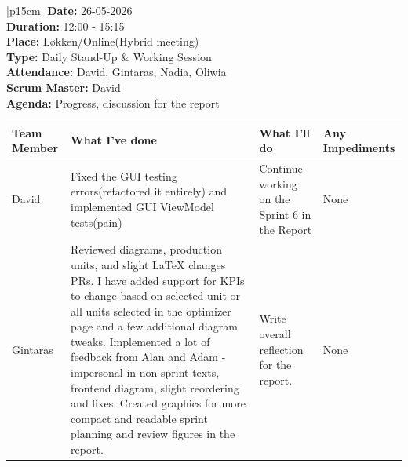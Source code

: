 \begin{table}[H]
    \centering
    \begin{tabular}{|p{15cm}|}   
        \hline
        \textbf{Date:}  26-05-2026 \\
        \textbf{Duration:}  12:00 - 15:15 \\
        \textbf{Place:}  Løkken/Online(Hybrid meeting) \\
        \textbf{Type:} Daily Stand-Up \& Working Session \\
        \textbf{Attendance:}  David, Gintaras, Nadia, Oliwia\\
        \textbf{Scrum Master:}  David \\
        \textbf{Agenda:} Progress, discussion for the report
        \begin{table}[H]
            \begin{tabular}{|p{1.75cm}|p{4cm}|p{4cm}|p{4cm}|}
                \hline
                \cellcolor[HTML]{BFBFBF}  \textbf{Team Member} & \cellcolor[HTML]{BFBFBF}  \textbf{What I've done} & \cellcolor[HTML]{BFBFBF}  \textbf{What I'll do} & \cellcolor[HTML]{BFBFBF}  \textbf{Any Impediments}\\
                \hline
                \cellcolor[HTML]{d4d4d4} David & Fixed the GUI testing errors(refactored it entirely) and implemented GUI ViewModel tests(pain) & Continue working on the Sprint 6 in the Report & None \\
                \hline
                \cellcolor[HTML]{d4d4d4} Gintaras & Reviewed diagrams, production units, and slight LaTeX changes PRs. I have added support for KPIs to change based on selected unit or all units selected in the optimizer page and a few additional diagram tweaks. Implemented a lot of feedback from Alan and Adam - impersonal in non-sprint texts, frontend diagram, slight reordering and fixes. Created graphics for more compact and readable sprint planning and review figures in the report. & Write overall reflection for the report. & None \\
                \hline
            \end{tabular}
        \end{table} \\
        \hline
    \end{tabular}
\end{table}


